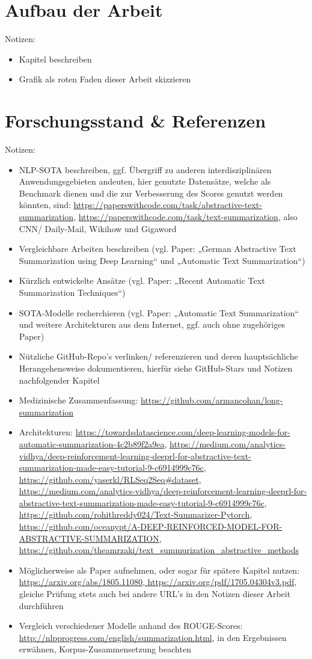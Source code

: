\section{Aufbau der Arbeit}
Notizen:
\begin{itemize}
	\item Kapitel beschreiben
	\item Grafik als roten Faden dieser Arbeit skizzieren
\end{itemize}


\section{Forschungsstand \& Referenzen}
Notizen:
\begin{itemize}
	\item NLP-SOTA beschreiben, ggf. Übergriff zu anderen interdisziplinären Anwendungsgebieten andeuten, hier genutzte Datensätze, welche als Benchmark dienen und die zur Verbesserung des Scores genutzt werden könnten, sind: \url{https://paperswithcode.com/task/abstractive-text-summarization}, \url{https://paperswithcode.com/task/text-summarization}, also CNN/ Daily-Mail, Wikihow und Gigaword
	\item Vergleichbare Arbeiten beschreiben (vgl. Paper: „German Abstractive Text Summarization using Deep Learning“ und „Automatic Text Summarization“)
	\item Kürzlich entwickelte Ansätze (vgl. Paper: „Recent Automatic Text Summarization Techniques“)
	\item SOTA-Modelle recherchieren (vgl. Paper: „Automatic Text Summarization“ und weitere Architekturen aus dem Internet, ggf. auch ohne zugehöriges Paper)
	\item Nützliche GitHub-Repo's verlinken/ referenzieren und deren hauptsächliche Herangehensweise dokumentieren, hierfür siehe GitHub-Stars und Notizen nachfolgender Kapitel
	\item Medizinische Zusammenfassung: \url{https://github.com/armancohan/long-summarization}
	\item Architekturen: \url{https://towardsdatascience.com/deep-learning-models-for-automatic-summarization-4c2b89f2a9ea}, \url{https://medium.com/analytics-vidhya/deep-reinforcement-learning-deeprl-for-abstractive-text-summarization-made-easy-tutorial-9-c6914999c76c}, \url{https://github.com/yaserkl/RLSeq2Seq#dataset}, \url{https://medium.com/analytics-vidhya/deep-reinforcement-learning-deeprl-for-abstractive-text-summarization-made-easy-tutorial-9-c6914999c76c}, \url{https://github.com/rohithreddy024/Text-Summarizer-Pytorch}, \url{https://github.com/oceanypt/A-DEEP-REINFORCED-MODEL-FOR-ABSTRACTIVE-SUMMARIZATION}, \url{https://github.com/theamrzaki/text_summurization_abstractive_methods}
	\item Möglicherweise als Paper aufnehmen, oder sogar für spätere Kapitel nutzen: \url{https://arxiv.org/abs/1805.11080, https://arxiv.org/pdf/1705.04304v3.pdf}, gleiche Prüfung stets auch bei andere URL's in den Notizen dieser Arbeit durchführen
	\item Vergleich verschiedener Modelle anhand des ROUGE-Scores: \url{http://nlpprogress.com/english/summarization.html}, in den Ergebnissen erwähnen, Korpus-Zusammensetzung beachten
\end{itemize}

